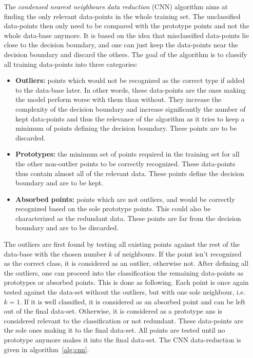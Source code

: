 The \emph{condensed nearest neighbours data reduction} (CNN) algorithm aims at finding the only relevant data-points in the whole training set. The unclassified data-points then only need to be compared with the prototype points and not the whole data-base anymore. It is based on the idea that misclassified data-points lie close to the decision boundary, and one can just keep the data-points near the decision boundary and discard the others. The goal of the algorithm is to classify all training data-points into three categories:
\begin{itemize}
    \item \textbf{Outliers:} points which would not be recognized as the correct type if added to the data-base later. In other words, these data-points are the ones making the model perform worse with them than without. They increase the complexity of the decision boundary and increase significantly the number of kept data-points and thus the relevance of the algorithm as it tries to keep a minimum of points defining the decision boundary. These points are to be discarded.
    \item \textbf{Prototypes:} the minimum set of points required in the training set for all the other non-outlier points to be correctly recognized. These data-points thus contain almost all of the relevant data. These points define the decision boundary and are to be kept.
    \item \textbf{Absorbed points:} points which are not outliers, and would be correctly recognized based on the sole prototype points. This could also be characterized as the redundant data. These points are far from the decision boundary and are to be discarded.
\end{itemize}

The outliers are first found by testing all existing points against the rest of the data-base with the chosen number $k$ of neighbours. If the point isn't recognized as the correct class, it is considered as an outlier, otherwise not. After defining all the outliers, one can proceed into the classification the remaining data-points as prototypes or absorbed points. This is done as following. Each point is once again tested against the data-set without the outliers, but with one sole neighbour, i.e. $k=1$. If it is well classified, it is considered as an absorbed point and can be left out of the final data-set. Otherwise, it is considered as a prototype ans is considered relevant to the classification or not redundant. These data-points are the sole ones making it to the final data-set. All points are tested until no prototype anymore makes it into the final data-set. The CNN data-reduction is given in algorithm~\ref{alg:cnn}.

